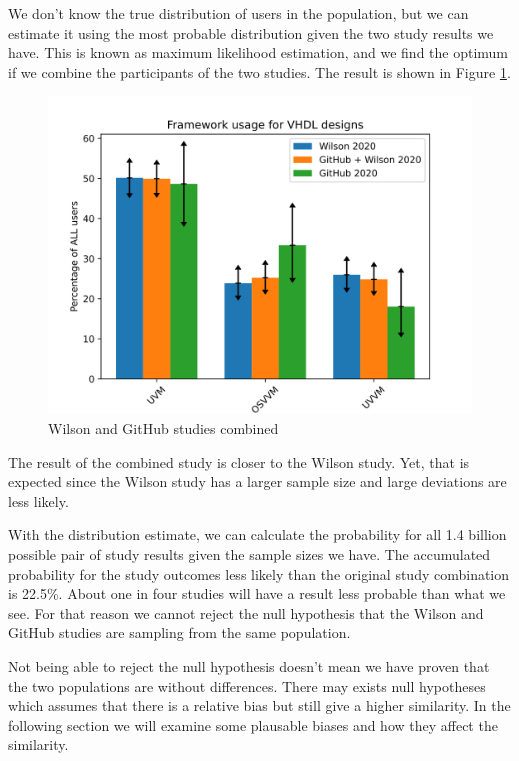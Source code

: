 \documentclass[]{article}
\begin{document}
We don't know the true distribution of users in the population, but we can estimate it using the most probable distribution given the two study results we have. This is known as maximum likelihood estimation, and we find the optimum if we combine the participants of the two studies. The result is shown in Figure \ref{fig:github-wilson-combined-comparison-2020}.

\begin{figure}

{\centering \includegraphics[width=0.85\linewidth]{img/github_wilson_combined_comparison_2020} 

}

\caption{Wilson and GitHub studies combined}\label{fig:github-wilson-combined-comparison-2020}
\end{figure}

The result of the combined study is closer to the Wilson study. Yet, that is expected since the Wilson study has a larger sample size and large deviations are less likely.

With the distribution estimate, we can calculate the probability for all 1.4 billion possible pair of study results given the sample sizes we have. The accumulated probability for the study outcomes less likely than the original study combination is 22.5\%. About one in four studies will have a result less probable than what we see. For that reason we cannot reject the null hypothesis that the Wilson and GitHub studies are sampling from the same population.

Not being able to reject the null hypothesis doesn't mean we have proven that the two populations are without differences. There may exists null hypotheses which assumes that there is a relative bias but still give a higher similarity. In the following section we will examine some plausable biases and how they affect the similarity.
\end{document}
